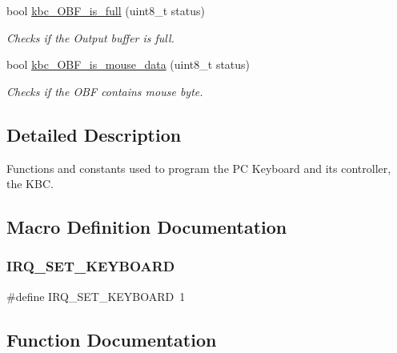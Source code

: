\begin{DoxyCompactItemize}
bool \mbox{\hyperlink{group__keyboard_ga4e0b2a8300752760d8c7f10fcb55b67a}{kbc\+\_\+\+O\+B\+F\+\_\+is\+\_\+full}} (uint8\+\_\+t status)
\begin{DoxyCompactList}\small\item\em Checks if the Output buffer is full. \end{DoxyCompactList}\item 
bool \mbox{\hyperlink{group__keyboard_ga559aca235f02f3322fe738495efdd0e0}{kbc\+\_\+\+O\+B\+F\+\_\+is\+\_\+mouse\+\_\+data}} (uint8\+\_\+t status)
\begin{DoxyCompactList}\small\item\em Checks if the O\+BF contains mouse byte. \end{DoxyCompactList}\end{DoxyCompactItemize}


\subsection{Detailed Description}
Functions and constants used to program the PC Keyboard and its controller, the K\+BC. 

\subsection{Macro Definition Documentation}
\mbox{\label{group__keyboard_ga09e63afbc5d0ab2780bd560fba326d58}} 
\subsubsection{\texorpdfstring{I\+R\+Q\+\_\+\+S\+E\+T\+\_\+\+K\+E\+Y\+B\+O\+A\+RD}{IRQ\_SET\_KEYBOARD}}
{\footnotesize\ttfamily \#define I\+R\+Q\+\_\+\+S\+E\+T\+\_\+\+K\+E\+Y\+B\+O\+A\+RD~1}



\subsection{Function Documentation}
\mbox{\label{group__keyboard_gaf87a23192c923b92891892df893963b7}} 
